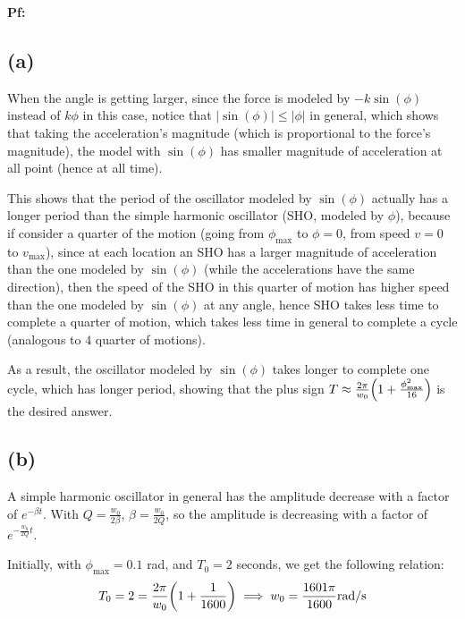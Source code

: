 \documentclass{article}
\DeclarePairedDelimiter{\paran}{(}{)}%
\begin{document}
\textbf{Pf:}
\subsection*{(a)}
When the angle is getting larger, since the force is modeled by $-k\sin(\phi)$ instead of $k\phi$ in this case, notice that $|\sin(\phi)|\leq|\phi|$ in general, which shows that taking the acceleration's magnitude (which is proportional to the force's magnitude), the model with $\sin(\phi)$ has smaller magnitude of acceleration at all point (hence at all time). 

This shows that the period of the oscillator modeled by $\sin(\phi)$ actually has a longer period than the simple harmonic oscillator (SHO, modeled by $\phi$), because if consider a quarter of the motion (going from $\phi_{\max}$ to $\phi=0$, from speed $v=0$ to $v_{\max}$), since at each location an SHO has a larger magnitude of acceleration than the one modeled by $\sin(\phi)$ (while the accelerations have the same direction), then the speed of the SHO in this quarter of motion has higher speed than the one modeled by $\sin(\phi)$ at any angle, hence SHO takes less time to complete a quarter of motion, which takes less time in general to complete a cycle (analogous to $4$ quarter of motions).

As a result, the oscillator modeled by $\sin(\phi)$ takes longer to complete one cycle, which has longer period, showing that the plus sign $T\approx\frac{2\pi}{w_0}\paran*{1+\frac{\phi_{\max}^2}{16}}$ is the desired answer.



\subsection*{(b)}
A simple harmonic oscillator in general has the amplitude decrease with a factor of $e^{-\beta t}$. With $Q=\frac{w_0}{2\beta}$, $\beta = \frac{w_0}{2Q}$, so the amplitude is decreasing with a factor of $e^{-\frac{w_0}{2Q}t}$.

Initially, with $\phi_{\max}=0.1$ rad, and $T_0=2$ seconds, we get the following relation:
\begin{equation}
    T_0=2 =  \frac{2\pi}{w_0}\paran*{1+\frac{1}{1600}}\implies w_0 = \frac{1601\pi}{1600}\textmd{rad/s}
\end{equation}

\hfil
\end{document}
